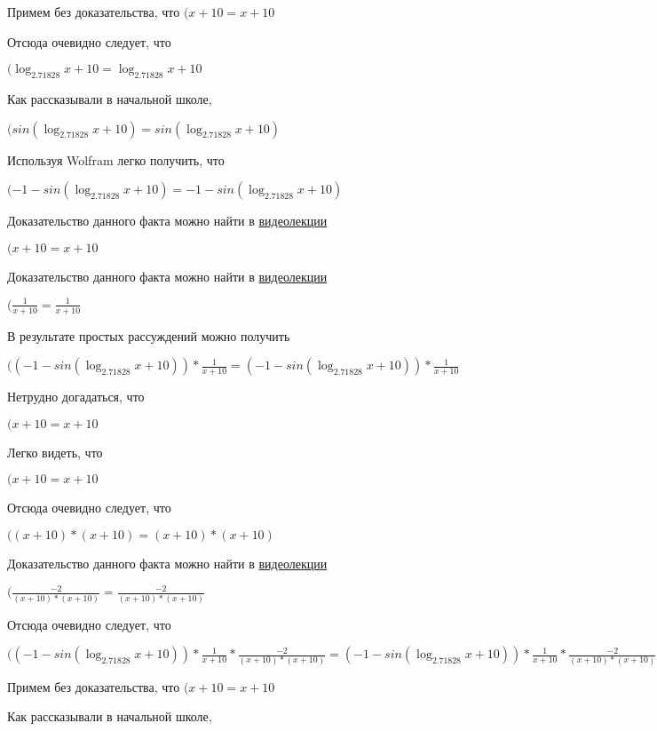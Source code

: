 \documentclass[12pt,a4paper,fleqn]{article}
\theoremstyle{definition}
\begin{document}
Примем без доказательства, что
$( x  +  10  =  x  +  10 $

Отсюда очевидно следует, что

$(\log_{ 2.71828 }{ x  +  10 } = \log_{ 2.71828 }{ x  +  10 }$

Как рассказывали в начальной школе,

$(sin(\log_{ 2.71828 }{ x  +  10 }) = sin(\log_{ 2.71828 }{ x  +  10 })$

Используя Wolfram легко получить, что

$( -1  - sin(\log_{ 2.71828 }{ x  +  10 }) =  -1  - sin(\log_{ 2.71828 }{ x  +  10 })$

Доказательство данного факта можно найти в \href{https://www.youtube.com/watch?v=dQw4w9WgXcQ}{видеолекции}

$( x  +  10  =  x  +  10 $

Доказательство данного факта можно найти в \href{https://www.youtube.com/watch?v=dQw4w9WgXcQ}{видеолекции}

$(\frac{ 1 }{ x  +  10 }
 = \frac{ 1 }{ x  +  10 }
$

В результате простых рассуждений можно получить

$(( -1  - sin(\log_{ 2.71828 }{ x  +  10 })) * \frac{ 1 }{ x  +  10 }
 = ( -1  - sin(\log_{ 2.71828 }{ x  +  10 })) * \frac{ 1 }{ x  +  10 }
$

Нетрудно догадаться, что

$( x  +  10  =  x  +  10 $

Легко видеть, что

$( x  +  10  =  x  +  10 $

Отсюда очевидно следует, что

$(( x  +  10 ) * ( x  +  10 ) = ( x  +  10 ) * ( x  +  10 )$

Доказательство данного факта можно найти в \href{https://www.youtube.com/watch?v=dQw4w9WgXcQ}{видеолекции}

$(\frac{ -2 }{( x  +  10 ) * ( x  +  10 )}
 = \frac{ -2 }{( x  +  10 ) * ( x  +  10 )}
$

Отсюда очевидно следует, что

$(( -1  - sin(\log_{ 2.71828 }{ x  +  10 })) * \frac{ 1 }{ x  +  10 }
 * \frac{ -2 }{( x  +  10 ) * ( x  +  10 )}
 = ( -1  - sin(\log_{ 2.71828 }{ x  +  10 })) * \frac{ 1 }{ x  +  10 }
 * \frac{ -2 }{( x  +  10 ) * ( x  +  10 )}
$

Примем без доказательства, что
$( x  +  10  =  x  +  10 $

Как рассказывали в начальной школе,
\end{document}
